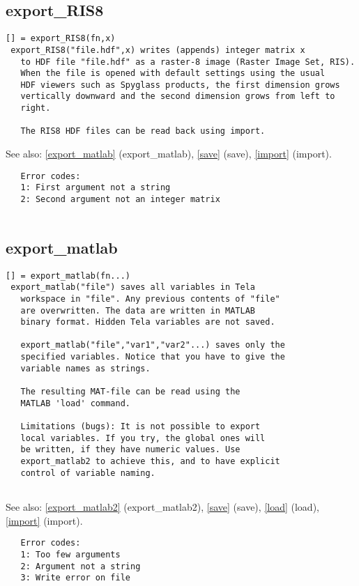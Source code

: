 \documentclass[a4paper]{article}
\begin{document}
\subsection{export\_RIS8\label{export_RIS8}}

\begin{tscreen}
\begin{verbatim}
[] = export_RIS8(fn,x)
 export_RIS8("file.hdf",x) writes (appends) integer matrix x
   to HDF file "file.hdf" as a raster-8 image (Raster Image Set, RIS).
   When the file is opened with default settings using the usual
   HDF viewers such as Spyglass products, the first dimension grows
   vertically downward and the second dimension grows from left to
   right.

   The RIS8 HDF files can be read back using import.
\end{verbatim}

See also: \ref{export_matlab} {(export\_matlab)}, \ref{save} {(save)}, \ref{import} {(import)}.
\begin{verbatim}
   Error codes:
   1: First argument not a string
   2: Second argument not an integer matrix
   
\end{verbatim}
\end{tscreen}





\subsection{export\_matlab\label{export_matlab}}

\begin{tscreen}
\begin{verbatim}
[] = export_matlab(fn...)
 export_matlab("file") saves all variables in Tela
   workspace in "file". Any previous contents of "file"
   are overwritten. The data are written in MATLAB
   binary format. Hidden Tela variables are not saved.

   export_matlab("file","var1","var2"...) saves only the
   specified variables. Notice that you have to give the
   variable names as strings.

   The resulting MAT-file can be read using the
   MATLAB 'load' command.
   
   Limitations (bugs): It is not possible to export
   local variables. If you try, the global ones will
   be written, if they have numeric values. Use
   export_matlab2 to achieve this, and to have explicit
   control of variable naming.
   
\end{verbatim}

See also: \ref{export_matlab2} {(export\_matlab2)}, \ref{save} {(save)}, \ref{load} {(load)}, \ref{import} {(import)}.
\begin{verbatim}
   Error codes:
   1: Too few arguments
   2: Argument not a string
   3: Write error on file
   
\end{verbatim}
\end{tscreen}
\end{document}
